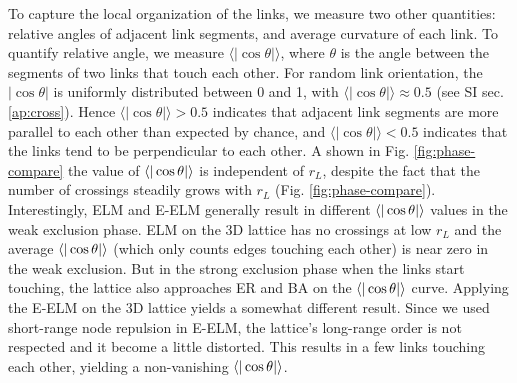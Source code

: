 \documentclass[nofootinbib,preprint,floatfix,endfloats]{revtex4} %
\begin{document}
To capture the local organization of the links,
we measure two other quantities: relative angles of adjacent link segments, and average curvature of each link. To quantify relative angle, we measure $\langle |\cos\theta |\rangle$, where $\theta$ is the angle between the segments of two links that touch each other. 
%
For random link orientation, the $|\cos\theta |$ is uniformly distributed between 0 and 1, with $\langle |\cos\theta |\rangle \approx 0.5$ (see SI sec. \ref{ap:cross}). 
Hence $\langle |\cos\theta |\rangle > 0.5 $ indicates that adjacent link segments are more parallel to each other than expected by chance, and $\langle |\cos\theta |\rangle < 0.5 $ indicates that the links tend to be perpendicular to each other. 
A shown in Fig. \ref{fig:phase-compare} the value of $\be{|\cos\theta|}$ is independent of $r_L$, despite the fact that the number of crossings steadily grows with $r_L$ (Fig. \ref{fig:phase-compare}).
Interestingly, ELM and E-ELM  generally result in different $\be{|\cos\theta|}$ values in the weak exclusion phase. 
ELM on the 3D lattice has no crossings at low $r_L$ and the average $\be{|\cos\theta|}$ (which only counts edges touching each other) is near zero in the weak exclusion. But in the strong exclusion phase when the links start touching, the lattice also approaches ER and BA on the $\be{|\cos\theta|}$ curve. 
Applying the E-ELM on the 3D lattice yields a somewhat different result. Since we used short-range node repulsion in E-ELM, the lattice's long-range order is not respected and it become a little distorted. This results in a few links touching each other, yielding a non-vanishing $\be{|\cos\theta|}$.
\end{document}

